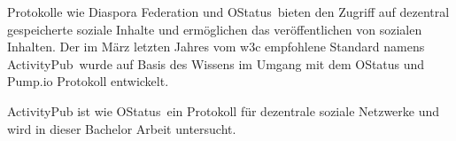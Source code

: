 {	
	Protokolle wie \glqq Diaspora Federation und OStatus\grqq~bieten den Zugriff auf dezentral gespeicherte soziale Inhalte und ermöglichen das veröffentlichen von sozialen Inhalten. Der im März letzten Jahres vom \gls{w3c} empfohlene Standard namens \glqq ActivityPub\grqq~wurde auf Basis des Wissens im Umgang mit dem OStatus und Pump.io Protokoll entwickelt\cite{activityPub}.\\ 
	
	ActivityPub ist wie \glqq OStatus\grqq~ein Protokoll für dezentrale soziale Netzwerke und wird in dieser Bachelor Arbeit untersucht.
}

